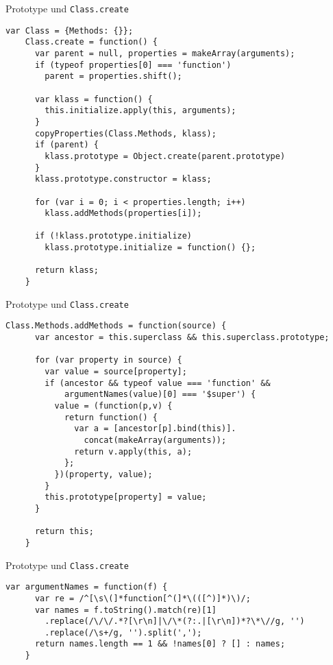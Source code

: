 \begin{frame}[fragile]{Prototype und \texttt{Class.create}}
  \begin{lstlisting}[gobble=4]
    var Class = {Methods: {}};
    Class.create = function() {
      var parent = null, properties = makeArray(arguments);
      if (typeof properties[0] === 'function')
        parent = properties.shift();
  
      var klass = function() {
        this.initialize.apply(this, arguments);
      }  
      copyProperties(Class.Methods, klass);
      if (parent) {
        klass.prototype = Object.create(parent.prototype)
      }
      klass.prototype.constructor = klass;
  
      for (var i = 0; i < properties.length; i++)
        klass.addMethods(properties[i]);
  
      if (!klass.prototype.initialize)
        klass.prototype.initialize = function() {};
  
      return klass;
    }
  \end{lstlisting}
\end{frame}

\begin{frame}[fragile]{Prototype und \texttt{Class.create}}
  \begin{lstlisting}[gobble=4]
    Class.Methods.addMethods = function(source) {
      var ancestor = this.superclass && this.superclass.prototype;
  
      for (var property in source) {
        var value = source[property];
        if (ancestor && typeof value === 'function' &&
            argumentNames(value)[0] === '$super') {
          value = (function(p,v) {
            return function() {
              var a = [ancestor[p].bind(this)].
                concat(makeArray(arguments));
              return v.apply(this, a);
            };
          })(property, value);
        }
        this.prototype[property] = value;
      }
  
      return this;
    }
  \end{lstlisting}
\end{frame}

\begin{frame}[fragile]{Prototype und \texttt{Class.create}}
  \begin{lstlisting}[gobble=4]
    var argumentNames = function(f) {
      var re = /^[\s\(]*function[^(]*\(([^)]*)\)/;
      var names = f.toString().match(re)[1]
        .replace(/\/\/.*?[\r\n]|\/\*(?:.|[\r\n])*?\*\//g, '')
        .replace(/\s+/g, '').split(',');
      return names.length == 1 && !names[0] ? [] : names;
    }
  \end{lstlisting}
\end{frame}


